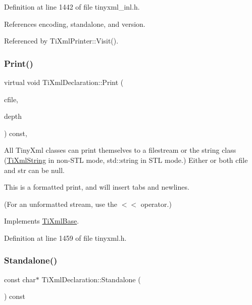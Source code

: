 Definition at line 1442 of file tinyxml\+\_\+inl.\+h.



References encoding, standalone, and version.



Referenced by Ti\+Xml\+Printer\+::\+Visit().

\hypertarget{class_ti_xml_declaration_ae46cff6565f299210ab945e78bf28514}{}\label{class_ti_xml_declaration_ae46cff6565f299210ab945e78bf28514} 
\subsubsection{\texorpdfstring{Print()}{Print()}\hspace{0.1cm}{\footnotesize\ttfamily [2/2]}}
{\footnotesize\ttfamily virtual void Ti\+Xml\+Declaration\+::\+Print (\begin{DoxyParamCaption}\item[{F\+I\+LE $\ast$}]{cfile,  }\item[{int}]{depth }\end{DoxyParamCaption}) const\hspace{0.3cm}{\ttfamily [inline]}, {\ttfamily [virtual]}}

All Tiny\+Xml classes can print themselves to a filestream or the string class (\hyperlink{class_ti_xml_string}{Ti\+Xml\+String} in non-\/\+S\+TL mode, std\+::string in S\+TL mode.) Either or both cfile and str can be null.

This is a formatted print, and will insert tabs and newlines.

(For an unformatted stream, use the $<$$<$ operator.) 

Implements \hyperlink{class_ti_xml_base_a0de56b3f2ef14c65091a3b916437b512}{Ti\+Xml\+Base}.



Definition at line 1459 of file tinyxml.\+h.

\hypertarget{class_ti_xml_declaration_a1f2f8a741593d15a61e491e5024cacef}{}\label{class_ti_xml_declaration_a1f2f8a741593d15a61e491e5024cacef} 
\subsubsection{\texorpdfstring{Standalone()}{Standalone()}}
{\footnotesize\ttfamily const char$\ast$ Ti\+Xml\+Declaration\+::\+Standalone (\begin{DoxyParamCaption}{ }\end{DoxyParamCaption}) const\hspace{0.3cm}{\ttfamily [inline]}}



